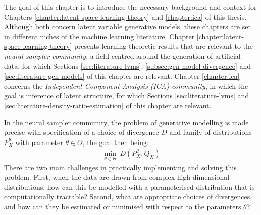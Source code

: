 The goal of this chapter is to introduce the necessary background and context for Chapters \ref{chapter:latent-space-learning-theory} and \ref{chapter:ica} of this thesis.
Although both concern latent variable generative models, these chapters are set in different niches of the machine learning literature.
Chapter \ref{chapter:latent-space-learning-theory} presents learning theoretic results that are relevant to the \emph{neural sampler community}, a field centred around the generation of artificial data, for which Sections \ref{sec:literature-lvms}, \ref{subsec:gen-model-divergence} and \ref{sec:literature-gen-models} of this chapter are relevant.
Chapter \ref{chapter:ica} concerns the \emph{Independent Component Analysis (ICA) community}, in which the goal is inference of latent structure, for which Sections \ref{sec:literature-lvms} and \ref{sec:literature-density-ratio-estimation} of this chapter are relevant.








In the neural sampler community, the problem of generative modelling is made precise with specification of a choice of divergence
$D$ and family of distributions $P_X^\theta$ with parameter $\theta\in\Theta$, the goal then being:
%
\begin{align*}
\min_{\theta \in \Theta} \ D\left(P_X^\theta,  Q_X \right)
\end{align*}
%
There are two main challenges in practically implementing and solving this problem.
First, when the data are drawn from complex high dimensional distributions, how can this be modelled with a parameterised distribution that is computationally tractable?
Second, what are appropriate choices of divergences, and how can they be estimated or minimised with respect to the parameters $\theta$?

